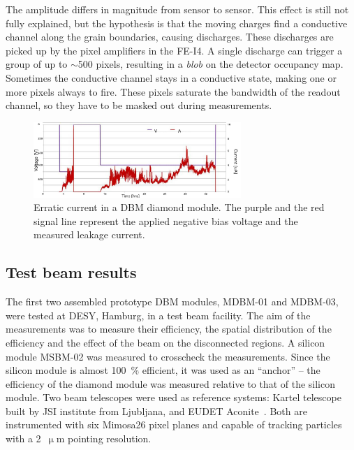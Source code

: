 The amplitude differs in magnitude from sensor to sensor. This effect is still not fully explained, but the hypothesis is that the moving charges find a conductive channel along the grain boundaries, causing discharges. These discharges are picked up by the pixel amplifiers in the FE-I4. A single discharge can trigger a group of up to $\sim$500 pixels, resulting in a \emph{blob} on the detector occupancy map. Sometimes the conductive channel stays in a conductive state, making one or more pixels always to fire. These pixels saturate the bandwidth of the readout channel, so they have to be masked out during measurements. 

\begin{figure}[!t]
\centering
\includegraphics[width=0.7\textwidth]{04_charge_monitoring/pics/erratic12} 
\caption{Erratic current in a DBM diamond module. The purple and the red signal line represent the applied negative bias voltage and the measured leakage current.}
\label{fig:erratic1}
\end{figure}

\subsection{Test beam results}
The first two assembled prototype DBM modules, MDBM-01 and MDBM-03, were tested at DESY, Hamburg, in a test beam facility. The aim of the measurements was to measure their efficiency, the spatial distribution of the efficiency and the effect of the beam on the disconnected regions. A silicon module MSBM-02 was measured to crosscheck the measurements. Since the silicon module is almost 100~\% efficient, it was used as an ``anchor'' -- the efficiency of the diamond module was measured relative to that of the silicon module. Two beam telescopes were used as reference systems: Kartel telescope~\cite{McGoldrick:1982209} built by JSI institute from Ljubljana, and EUDET Aconite~\cite{ACONI:00000}. Both are instrumented with six Mimosa26 pixel planes and capable of tracking particles with a 2~$\upmu$m pointing resolution.

